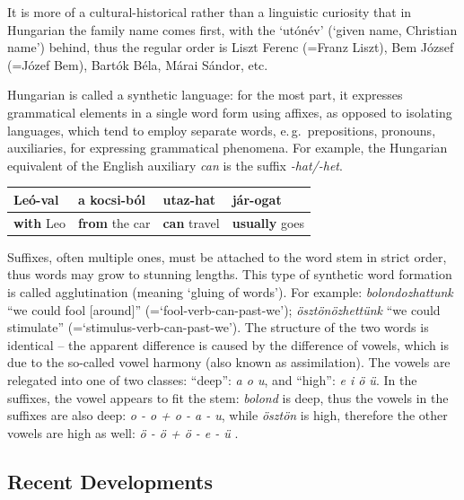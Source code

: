 \begin{multicols}{2}
It is more of a cultural-historical rather than a linguistic curiosity that in Hungarian the family name comes first, with the `utónév' (`given name, Christian name') behind, thus the regular order is Liszt Ferenc (=Franz Liszt), Bem József (=Józef Bem), Bartók Béla, Márai Sándor, etc.

Hungarian is called a synthetic language: for the most part, it expresses grammatical elements in a single word form using affixes, as opposed to isolating languages, which tend to employ separate words, e.\,g.~prepositions, pronouns, auxiliaries, for expressing grammatical phenomena. For example, the Hungarian equivalent of the English auxiliary \textit{can} is the suffix \textit{-hat/-het}.

\vspace{3mm} 

\begin{tabular}{l|l|l|l}
    Leó-\textbf{val} & a kocsi-\textbf{ból} & utaz-\textbf{hat} & jár-\textbf{ogat}\\
    \hline
    \textbf{with} Leo & \textbf{from} the car & \textbf{can} travel & \textbf{usually} goes \\
  \end{tabular}

\vspace{3mm} 

Suffixes, often multiple ones, must be attached to the word stem in strict order, thus words may grow to stunning lengths. This type of synthetic word formation is called agglutination (meaning `gluing of words'). For example: \textit{bolondozhattunk} ``we could fool [around]'' (=`fool-verb-can-past-we'); \textit{ösztönözhettünk} ``we could stimulate'' (=`stimulus-verb-can-past-we'). The structure of the two words is identical -- the apparent difference is caused by the difference of vowels, which is due to the so-called vowel harmony (also known as assimilation). The vowels are relegated into one of two classes: ``deep'': \textit{a o u}, and ``high'': \textit{e i ö ü}. In the suffixes, the vowel appears to fit the stem: \textit{bolond} is deep, thus the vowels in the suffixes are also deep: \textit{o - o + o - a - u}, while \textit{ösztön} is high, therefore the other vowels are high as well: \textit{ö - ö + ö - e - ü} \cite{didyouknow1}.

\subsection{Recent Developments}


\end{multicols}
